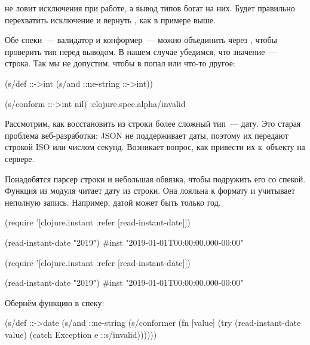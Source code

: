 
 не ловит исключения при работе, а вывод типов богат на
них. Будет правильно перехватить исключение и вернуть , как
в примере выше.

Обе спеки~--- валидатор и конформер~--- можно объединить через ,
чтобы проверить тип перед выводом. В нашем случае убедимся, что значение~---
строка. Так мы не допустим, чтобы в  попал  или
что-то другое:


\begin{clojure}
(s/def ::->int
  (s/and ::ne-string ::->int))

(s/conform ::->int nil)
:clojure.spec.alpha/invalid
\end{clojure}



Рассмотрим, как восстановить из строки более сложный тип~--- дату. Это старая
проблема веб-разработки: JSON не поддерживает даты, поэтому их передают строкой
ISO или числом секунд. Возникает вопрос, как привести их к~объекту на сервере.


Понадобятся парсер строки и небольшая обвязка, чтобы подружить его со
спекой. Функция  из модуля  читает
дату из строки. Она лояльна к формату и учитывает неполную запись. Например,
датой может быть только год.


\ifnarrow


\begin{clojure}
(require '[clojure.instant
           :refer [read-instant-date]])

(read-instant-date "2019")
#inst "2019-01-01T00:00:00.000-00:00"
\end{clojure}


\else


\begin{clojure}
(require '[clojure.instant :refer [read-instant-date]])

(read-instant-date "2019")
#inst "2019-01-01T00:00:00.000-00:00"
\end{clojure}


\fi

Обернём функцию в спеку:


\begin{clojure}
(s/def ::->date
  (s/and
   ::ne-string
   (s/conformer
    (fn [value]
      (try
        (read-instant-date value)
        (catch Exception e
          ::s/invalid))))))
\end{clojure}


